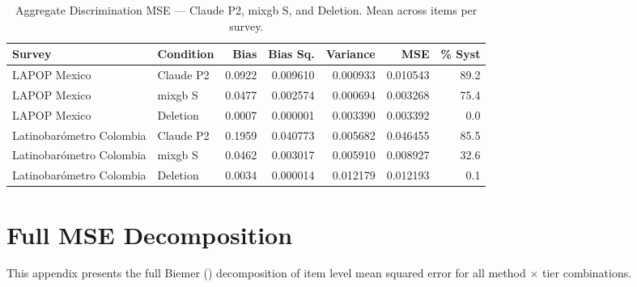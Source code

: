 \documentclass[
  man,
  floatsintext,
  longtable,
  nolmodern,
  notxfonts,
  notimes,
  colorlinks=true,linkcolor=blue,citecolor=blue,urlcolor=blue]{apa7}
\begin{document}
\begin{table}
\caption{Aggregate Discrimination MSE --- Claude P2, mixgb S, and Deletion. Mean
across items per survey.}\tabularnewline

\centering\begingroup\fontsize{10}{12}\selectfont

\begin{tabular}{llrrrrr}
\toprule
Survey & Condition & Bias & Bias Sq. & Variance & MSE & \% Syst\\
\midrule
LAPOP Mexico & Claude P2 & 0.0922 & 0.009610 & 0.000933 & 0.010543 & 89.2\\
LAPOP Mexico & mixgb S & 0.0477 & 0.002574 & 0.000694 & 0.003268 & 75.4\\
LAPOP Mexico & Deletion & 0.0007 & 0.000001 & 0.003390 & 0.003392 & 0.0\\
Latinobarómetro Colombia & Claude P2 & 0.1959 & 0.040773 & 0.005682 & 0.046455 & 85.5\\
Latinobarómetro Colombia & mixgb S & 0.0462 & 0.003017 & 0.005910 & 0.008927 & 32.6\\
\addlinespace
Latinobarómetro Colombia & Deletion & 0.0034 & 0.000014 & 0.012179 & 0.012193 & 0.1\\
\bottomrule
\end{tabular}
\endgroup{}
\end{table}

\section{Full MSE Decomposition}\label{apx-mse-full}

This appendix presents the full Biemer ()
decomposition of item level mean squared error for all method \(\times\)
tier combinations.
\end{document}

